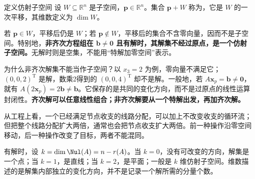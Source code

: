 \documentclass[a4paper,12pt,twoside,openany,fontset=none]{ctexbook}
\newcounter{definition}[chapter]
\newenvironment{definition}[1][]{\begin{defBox}{定义}{#1}}{\end{defBox}}
\numberwithin{equation}{chapter}
\begin{document}
\begin{definition}[仿射子空间]
设 $W\subseteq\mathbb R^n$ 是子空间，$\boldsymbol p\in\mathbb R^n$。集合 $\boldsymbol p+W$ 称为，它是 $W$ 的一次平移，其维数定义为 $\dim W$。
\end{definition}
若 $\boldsymbol p\in W$，平移后仍是 $W$；若 $\boldsymbol p\notin W$，平移后的集合不含零向量，因而不是子空间。特别地，\textbf{非齐次方程组在 $\boldsymbol b\ne\boldsymbol0$ 且有解时，其解集不经过原点，是一个仿射子空间。}无解时则是空集，不能用“特解加零空间”表示。

为什么非齐次解集不能当作子空间？以 $x_3=2$ 为例，零向量不满足它；$(0,0,2)^{\mathrm T}$ 是解，数乘2得到的 $(0,0,4)^{\mathrm T}$ 却不是解。一般地，若 $A\boldsymbol x_p=\boldsymbol b\ne\boldsymbol0$，就有 $A(2\boldsymbol x_p)=2\boldsymbol b\ne\boldsymbol b$。它保存的是共同的变化方向，而不是过原点的线性运算封闭性。\textbf{齐次解可以任意线性组合；非齐次解要从一个特解出发，再加齐次解。}

从工程上看，一个已经满足节点收支的线路分配，可以加上不改变收支的循环流；但把整个线路分配扩大两倍，通常也会把节点收支扩大两倍。前一种操作沿零空间移动，后一种操作改变了目标，两者不能混同。

有解时，设 $k=\dim\Nul(A)=n-r(A)$。当 $k=0$，没有可改变的方向，解集是一个点；当 $k=1$，是直线；当 $k=2$，是平面；一般是 $k$ 维仿射子空间。维数描述的是解集内部独立的变化方向，并不是记录一个解所需的分量个数。
\end{document}
